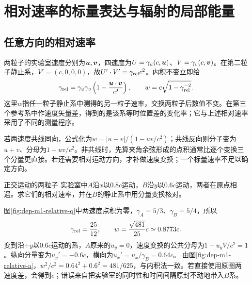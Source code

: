 \section{相对速率的标量表达与辐射的局部能量}
\subsection{任意方向的相对速率}
两粒子的实验室速度分别为$\bm{u},\bm{v}$，四速度为$U=\gamma_u(c,\bm{u})$、$V=\gamma_v(c,\bm{v})$。在第二粒子静止系，$V'=(c,0,0,0)$，故$U'\cdot V'=\gamma_{\rm rel}c^2$。内积不变立即给
\[
 \gamma_{\rm rel}=\gamma_u\gamma_v
 \left(1-\frac{\bm{u}\cdot\bm{v}}{c^2}\right),\qquad
 w=c\sqrt{1-\gamma_{\rm rel}^{-2}}.
\]
这里$w$指任一粒子静止系中测得的另一粒子速率，交换两粒子后数值不变。在第三个参考系中作速度矢量差，得到的是该系等时位置差的变化率；它与上述相对速率采用了不同的测量程序。

若两速度共线同向，公式化为$w=|u-v|/(1-uv/c^2)$；共线反向则分子变为$u+v$、分母为$1+uv/c^2$。非共线时，先算夹角余弦形成的点积通常比逐个变换三个分量更直接。若还需要相对运动方向，才补做速度变换；一个标量速率不足以确定方向。

\begin{example}正交运动的两粒子
实验室中$A$沿$x$以$0.8c$运动，$B$沿$y$以$0.6c$运动，两者在原点相遇。求它们的相对速率，并在$B$的静止系中用分量变换核对。
\end{example}
\begin{solution}
图\ref{fig:dep-m1-relative-q}中两速度点积为零，$\gamma_A=5/3$、$\gamma_B=5/4$，所以
\[
 \gamma_{\rm rel}=\frac{25}{12},\qquad
 w=\frac{\sqrt{481}}{25}c\simeq0.8773c.
\]
变到沿$+y$以$0.6c$运动的系，$A$原来的$u_y=0$，速度变换的公共分母为$1-u_yV/c^2=1$。纵向分量变为$u_y'=-0.6c$，横向为$u_x'=u_x/\gamma_B=0.64c$。
由图\ref{fig:dep-m1-relative-a}，$w^2/c^2=0.64^2+0.6^2=481/625$，与内积法一致。若直接使用原图两速度差，会得到$c$；错误来自把实验室的同时性和时间间隔原封不动地带入$B$系。
\end{solution}

